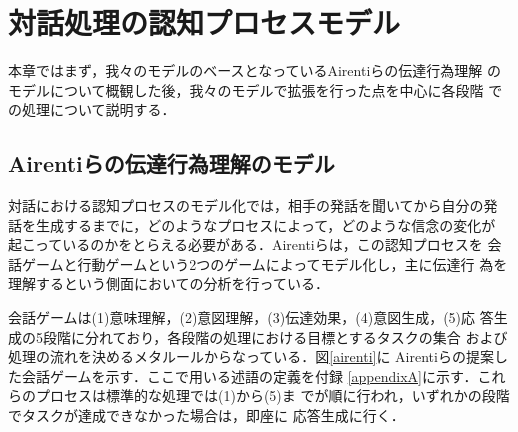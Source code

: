 \section{対話処理の認知プロセスモデル}

本章ではまず，我々のモデルのベースとなっているAirentiらの伝達行為理解
のモデルについて概観した後，我々のモデルで拡張を行った点を中心に各段階
での処理について説明する．

\subsection{Airentiらの伝達行為理解のモデル}

対話における認知プロセスのモデル化では，相手の発話を聞いてから自分の発
話を生成するまでに，どのようなプロセスによって，どのような信念の変化が
起こっているのかをとらえる必要がある．Airentiらは，この認知プロセスを
会話ゲームと行動ゲームという2つのゲームによってモデル化し，主に伝達行
為を理解するという側面においての分析を行っている\cite{airenti93}．

会話ゲームは(1)意味理解，(2)意図理解，(3)伝達効果，(4)意図生成，(5)応
答生成の5段階に分れており，各段階の処理における目標とするタスクの集合
および処理の流れを決めるメタルールからなっている．図\ref{airenti}に
Airentiらの提案した会話ゲームを示す．ここで用いる述語の定義を付録
\ref{appendixA}に示す．これらのプロセスは標準的な処理では(1)から(5)ま
でが順に行われ，いずれかの段階でタスクが達成できなかった場合は，即座に
応答生成に行く．

